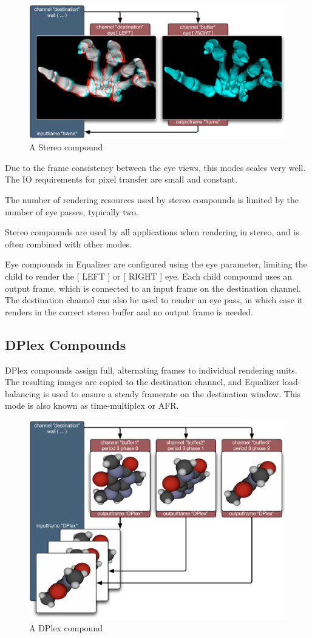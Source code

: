 \documentclass[10pt,a4]{scrartcl}
\begin{document}
\begin{figure}
  \includegraphics[width=.618\textwidth]{images/EYE.pdf}
  {\caption{\label{fStereoCmp}\small A Stereo compound}}
\end{figure}
Due to the frame consistency between the eye views, this modes scales
very well. The IO requirements for pixel transfer are small and
constant.

The number of rendering resources used by stereo compounds is limited by
the number of eye passes, typically two. 

Stereo compounds are used by all applications when rendering in stereo,
and is often combined with other modes.

Eye compounds in Equalizer are configured using the \textsf{eye}
parameter, limiting the child to render the \textsf{[ LEFT ]} or
\textsf{[ RIGHT ]} eye. Each child compound uses an output frame, which
is connected to an input frame on the destination channel. The
destination channel can also be used to render an eye pass, in which case
it renders in the correct stereo buffer and no output frame is needed.


\subsection{\label{sDPlex}DPlex Compounds}

DPlex compounds assign full, alternating frames to individual rendering
units. The resulting images are copied to the destination channel, and
Equalizer load-balancing is used to ensure a steady framerate on the
destination window. This mode is also known as time-multiplex or AFR.

\begin{figure}
  \includegraphics[width=.618\textwidth]{images/DPlex.pdf}
  {\caption{\small A DPlex compound}}
\end{figure}
\end{document}
